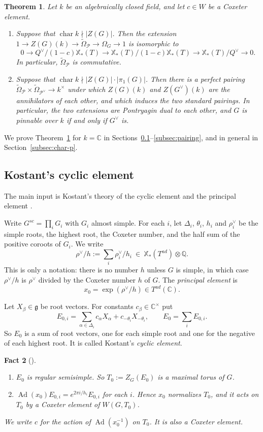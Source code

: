 \documentclass[psamsfonts]{amsart}
\newtheorem{thm}{Theorem}[section]
\theoremstyle{definition}
\theoremstyle{remark}
\numberwithin{equation}{section}
\newcommand{\Q}{\mathbb{Q}}
\newcommand{\X}{\mathbb{X}}
\newcommand{\ra}{\rightarrow}
\newcommand{\tOm}{\widetilde{\Omega}}
\DeclareMathOperator{\Ad}{Ad}
\DeclareMathOperator{\chara}{char}
\newcommand\cP{\mathcal{P}}
\newcommand{\CC}{\mathbb{C}}
\numberwithin{equation}{section}
\newcommand{\fg}{\mathfrak{g}}
\newcommand{\Om}{\Omega}
\theoremstyle{plain}
\newtheorem{fact}[thm]{Fact}
\begin{document}
\begin{thm}\label{thm:duality}
Let $k$ be an algebraically closed field, and let $c\in W$ be a Coxeter element.
\begin{enumerate}[(1)]
\item Suppose that $\chara k\nmid|Z(G)|$. Then the extension $1\ra Z(G)(k)\ra \tOm_\cP\ra\Om_G\ra1$ is isomorphic to
\[
0\ra Q^\vee/(1-c)\X_*(T)\ra\X_*(T)/(1-c)\X_*(T)\ra\X_*(T)/Q^\vee\ra0.
\]
In particular, $\tOm_\cP$ is commutative.
\item Suppose that $\chara k\nmid|Z(G)|\cdot|\pi_1(G)|$. Then there is a perfect pairing $\tOm_\cP\times \tOm_{\cP^\vee}\ra k^\times$ under which $Z(G)(k)$ and $Z(G^\vee)(k)$ are the annihilators of each other, and which induces the two standard pairings. In particular, the two extensions are Pontryagin dual to each other, and $G$ is pinnable over $k$ if and only if $G^\vee$ is.
\end{enumerate}
\end{thm}

We prove Theorem~\ref{thm:duality} for $k=\CC$ in Sections~\ref{subsec:kostant}--\ref{subsec:pairing}, and in general in Section~\ref{subsec:char-p}.

\subsection{Kostant's cyclic element}\label{subsec:kostant}
The main input is Kostant's theory of the cyclic element and the principal element \cite{Kos59}.

Write $G^{sc}=\prod_iG_i$ with $G_i$ almost simple. For each $i$, let $\Delta_i$, $\theta_i$, $h_i$ and $\rho_i^\vee$ be the simple roots, the highest root, the Coxeter number, and the half sum of the positive coroots of $G_i$. We write
\[
\rho^\vee/h:=\sum_i\rho_i^\vee/h_i\ \in\ \X_*(T^{ad})\otimes\Q.
\]
This is only a notation: there is no number $h$ unless $G$ is simple, in which case $\rho^\vee/h$ is $\rho^\vee$ divided by the Coxeter number $h$ of $G$. The \emph{principal element} is
\[
x_0=\exp(\rho^\vee/h)\in T^{ad}(\CC).
\]

Let $X_\beta\in\fg$ be root vectors. For constants $c_\beta\in\CC^\times$ put
\[
E_{0,i}=\sum_{\alpha\in\Delta_i}c_\alpha X_\alpha+c_{-\theta_i}X_{-\theta_i},\qquad E_0=\sum_iE_{0,i}.
\]
So $E_0$ is a sum of root vectors, one for each simple root and one for the negative of each highest root. It is called Kostant's \emph{cyclic element}.

\begin{fact}[{\cite[\S6]{Kos59}}]\label{fact:kostant}
\begin{enumerate}[(1)]
\item $E_0$ is regular semisimple. So $T_0:=Z_G(E_0)$ is a maximal torus of $G$.
\item $\Ad(x_0)E_{0,i}=e^{2\pi i/h_i}E_{0,i}$ for each $i$. Hence $x_0$ normalizes $T_0$, and it acts on $T_0$ by a Coxeter element of $W(G,T_0)$.
\end{enumerate}
We write $c$ for the action of $\Ad(x_0^{-1})$ on $T_0$. It is also a Coxeter element.
\end{fact}
\end{document}
